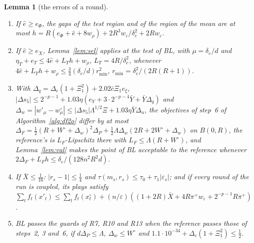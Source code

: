 \documentclass[11pt]{amsart}
\newtheorem{lemma}[theorem]{Lemma}
\theoremstyle{definition}
\numberwithin{equation}{section}
\begin{document}
\begin{lemma}[the errors of a round]
\begin{enumerate}[label=E\arabic*.,leftmargin=2.4em]
\item[E14.] If $\hat e\ge e_\Phi$, the gaps of the test region and of the region of the mean are at most $h=R(e_\Phi+\hat e+8w_\rho)+2R^3w_\varepsilon/\delta_e^2+2Rw_\varepsilon$.
\item[E15.] If $\hat e\ge e_X$, Lemma~\ref{lem:sel} applies at the test of BL, with $\mu=\delta_e/d$ and $\eta_T+e_T\le4\hat e+L_\Upsilon h+w_\rho$, $L_\Upsilon=4R/\delta_e^2$, whenever $4\hat e+L_\Upsilon h+w_\rho\le\frac34(\delta_e/d)r_{\min}^2$, $r_{\min}=\delta_e^2/(2R(R+1))$.
\item[E16.] With $\Delta_q=\Delta_c(1+\Xi_1^2)+2.02\bar c\Xi_1e_\xi$, $|\Delta s_5|\le2^{-p-1}+1.03\eta(e_Y+3\cdot2^{-p-4}\bar Y+\bar Y\Delta_q)$ and $\Delta_w=|w'_\mu-w^\circ_\mu|\le|\Delta s_5|\Lambda^{1/2}\Xi+1.03\eta\bar Y\Delta_u$, the objectives of step~6 of Algorithm~\ref{alg:df2o} differ by at most $\Delta_F=\frac12(R+W^\circ+\Delta_w)^2\Delta_P+\frac12\Lambda\Delta_w(2R+2W^\circ+\Delta_w)$ on $B(0,R)$, the reference's is $L_F$-Lipschitz there with $L_F\le\Lambda(R+W^\circ)$, and Lemma~\ref{lem:val} makes the point of BL acceptable to the reference whenever $2\Delta_F+L_Fh\le\delta_e/(128n^2R^2d)$.
\item[E17.] If $\bar X\le\frac1{16}$: $|r_s-1|\le\frac14$ and $\tau(m_s,r_s)\le\tau_0+\tau_1|\varepsilon_s|$; and if every round of the run is coupled, its plays satisfy $\sum_tf_t(x'_t)\le\sum_tf_t(x^\circ_t)+(n/\varepsilon)((1+2R)\bar X+4R\pi^+w_\varepsilon+2^{-p-1}R\pi^+)$.
\item[E18.] BL passes the guards of R7, R10 and R13 when the reference passes those of steps~2, 3 and~6, if $d\Delta_P\le\Lambda$, $\Delta_w\le W^\circ$ and $1.1\cdot10^{-34}+\Delta_c(1+\Xi_1^2)\le\frac12$.
\end{enumerate}
\end{lemma}
\end{document}
